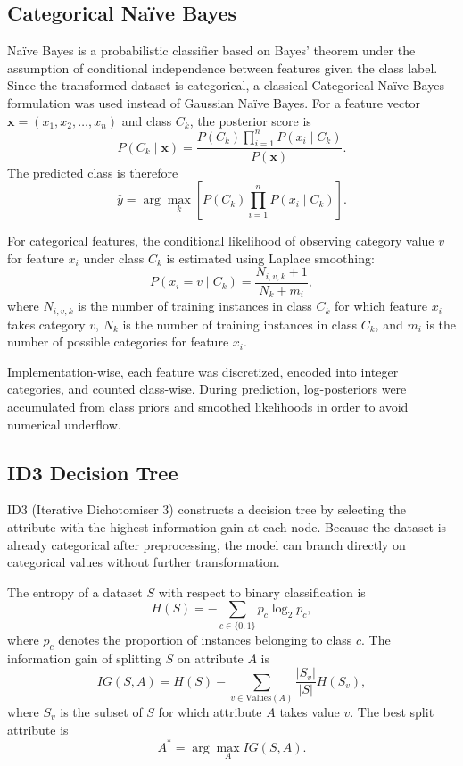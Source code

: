 \documentclass[conference]{IEEEtran}
\begin{document}
\subsection{Categorical Na\"ive Bayes}
Na\"ive Bayes is a probabilistic classifier based on Bayes' theorem under the assumption of conditional independence between features given the class label. Since the transformed dataset is categorical, a classical Categorical Na\"ive Bayes formulation was used instead of Gaussian Na\"ive Bayes. For a feature vector $\mathbf{x} = (x_1, x_2, \ldots, x_n)$ and class $C_k$, the posterior score is
\begin{equation}
P(C_k \mid \mathbf{x}) = \frac{P(C_k)\prod_{i=1}^{n} P(x_i \mid C_k)}{P(\mathbf{x})}.
\end{equation}
The predicted class is therefore
\begin{equation}
\hat{y} = \arg\max_{k} \left[P(C_k)\prod_{i=1}^{n} P(x_i \mid C_k)\right].
\end{equation}

For categorical features, the conditional likelihood of observing category value $v$ for feature $x_i$ under class $C_k$ is estimated using Laplace smoothing:
\begin{equation}
P(x_i = v \mid C_k) = \frac{N_{i,v,k}+1}{N_k + m_i},
\end{equation}
where $N_{i,v,k}$ is the number of training instances in class $C_k$ for which feature $x_i$ takes category $v$, $N_k$ is the number of training instances in class $C_k$, and $m_i$ is the number of possible categories for feature $x_i$.

Implementation-wise, each feature was discretized, encoded into integer categories, and counted class-wise. During prediction, log-posteriors were accumulated from class priors and smoothed likelihoods in order to avoid numerical underflow.

\subsection{ID3 Decision Tree}
ID3 (Iterative Dichotomiser 3) constructs a decision tree by selecting the attribute with the highest information gain at each node. Because the dataset is already categorical after preprocessing, the model can branch directly on categorical values without further transformation.

The entropy of a dataset $S$ with respect to binary classification is
\begin{equation}
H(S) = -\sum_{c \in \{0,1\}} p_c \log_2 p_c,
\end{equation}
where $p_c$ denotes the proportion of instances belonging to class $c$. The information gain of splitting $S$ on attribute $A$ is
\begin{equation}
IG(S,A) = H(S) - \sum_{v \in \mathrm{Values}(A)} \frac{|S_v|}{|S|}H(S_v),
\end{equation}
where $S_v$ is the subset of $S$ for which attribute $A$ takes value $v$. The best split attribute is
\begin{equation}
A^\ast = \arg\max_A IG(S,A).
\end{equation}
\end{document}
